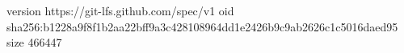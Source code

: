 version https://git-lfs.github.com/spec/v1
oid sha256:b1228a9f8f1b2aa22bff9a3c428108964dd1e2426b9c9ab2626c1c5016daed95
size 466447
